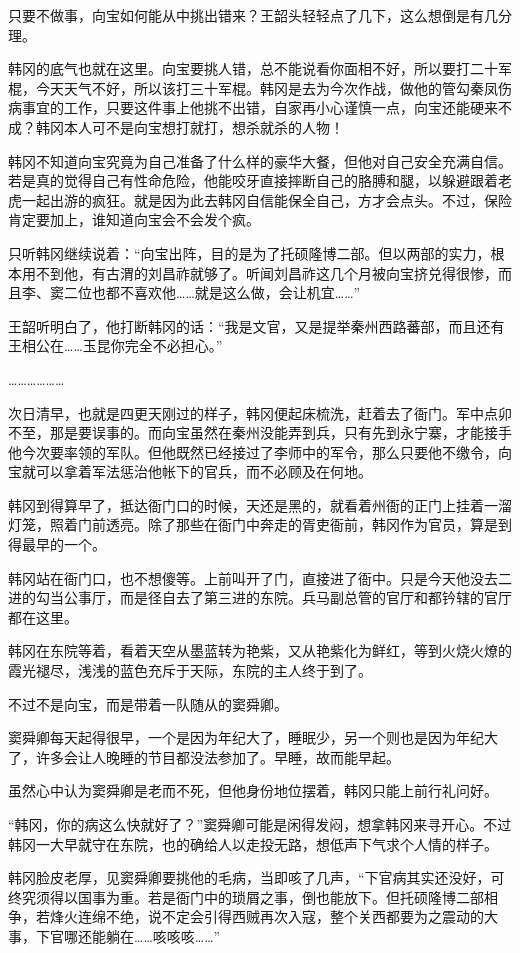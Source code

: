 只要不做事，向宝如何能从中挑出错来？王韶头轻轻点了几下，这么想倒是有几分理。

韩冈的底气也就在这里。向宝要挑人错，总不能说看你面相不好，所以要打二十军棍，今天天气不好，所以该打三十军棍。韩冈是去为今次作战，做他的管勾秦凤伤病事宜的工作，只要这件事上他挑不出错，自家再小心谨慎一点，向宝还能硬来不成？韩冈本人可不是向宝想打就打，想杀就杀的人物！

韩冈不知道向宝究竟为自己准备了什么样的豪华大餐，但他对自己安全充满自信。若是真的觉得自己有性命危险，他能咬牙直接摔断自己的胳膊和腿，以躲避跟着老虎一起出游的疯狂。就是因为此去韩冈自信能保全自己，方才会点头。不过，保险肯定要加上，谁知道向宝会不会发个疯。

只听韩冈继续说着：“向宝出阵，目的是为了托硕隆博二部。但以两部的实力，根本用不到他，有古渭的刘昌祚就够了。听闻刘昌祚这几个月被向宝挤兑得很惨，而且李、窦二位也都不喜欢他……就是这么做，会让机宜……”

王韶听明白了，他打断韩冈的话：“我是文官，又是提举秦州西路蕃部，而且还有王相公在……玉昆你完全不必担心。”

………………

次日清早，也就是四更天刚过的样子，韩冈便起床梳洗，赶着去了衙门。军中点卯不至，那是要误事的。而向宝虽然在秦州没能弄到兵，只有先到永宁寨，才能接手他今次要率领的军队。但他既然已经接过了李师中的军令，那么只要他不缴令，向宝就可以拿着军法惩治他帐下的官兵，而不必顾及在何地。

韩冈到得算早了，抵达衙门口的时候，天还是黑的，就看着州衙的正门上挂着一溜灯笼，照着门前透亮。除了那些在衙门中奔走的胥吏衙前，韩冈作为官员，算是到得最早的一个。

韩冈站在衙门口，也不想傻等。上前叫开了门，直接进了衙中。只是今天他没去二进的勾当公事厅，而是径自去了第三进的东院。兵马副总管的官厅和都钤辖的官厅都在这里。

韩冈在东院等着，看着天空从墨蓝转为艳紫，又从艳紫化为鲜红，等到火烧火燎的霞光褪尽，浅浅的蓝色充斥于天际，东院的主人终于到了。

不过不是向宝，而是带着一队随从的窦舜卿。

窦舜卿每天起得很早，一个是因为年纪大了，睡眠少，另一个则也是因为年纪大了，许多会让人晚睡的节目都没法参加了。早睡，故而能早起。

虽然心中认为窦舜卿是老而不死，但他身份地位摆着，韩冈只能上前行礼问好。

“韩冈，你的病这么快就好了？”窦舜卿可能是闲得发闷，想拿韩冈来寻开心。不过韩冈一大早就守在东院，也的确给人以走投无路，想低声下气求个人情的样子。

韩冈脸皮老厚，见窦舜卿要挑他的毛病，当即咳了几声，“下官病其实还没好，可终究须得以国事为重。若是衙门中的琐屑之事，倒也能放下。但托硕隆博二部相争，若烽火连绵不绝，说不定会引得西贼再次入寇，整个关西都要为之震动的大事，下官哪还能躺在……咳咳咳……”

